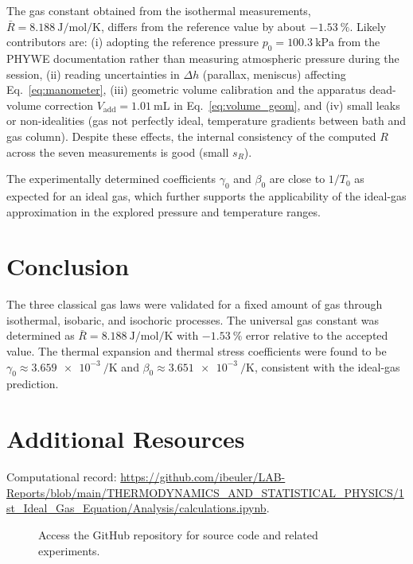 \documentclass[journal]{IEEEtran}
\begin{document}
The gas constant obtained from the isothermal measurements, $\bar{R}=\SI{8.188}{\joule\per\mole\per\kelvin}$, differs from the reference value by about $\SI{-1.53}{\percent}$. Likely contributors are: (i) adopting the reference pressure $p_0=\SI{100.3}{\kilo\pascal}$ from the PHYWE documentation rather than measuring atmospheric pressure during the session, (ii) reading uncertainties in $\Delta h$ (parallax, meniscus) affecting Eq.~\eqref{eq:manometer}, (iii) geometric volume calibration and the apparatus dead-volume correction $V_{\mathrm{add}}=\SI{1.01}{\milli\liter}$ in Eq.~\eqref{eq:volume_geom}, and (iv) small leaks or non-idealities (gas not perfectly ideal, temperature gradients between bath and gas column). Despite these effects, the internal consistency of the computed $R$ across the seven measurements is good (small $s_R$).

The experimentally determined coefficients $\gamma_0$ and $\beta_0$ are close to $1/T_0$ as expected for an ideal gas, which further supports the applicability of the ideal-gas approximation in the explored pressure and temperature ranges.

\section{Conclusion}
The three classical gas laws were validated for a fixed amount of gas through isothermal, isobaric, and isochoric processes. The universal gas constant was determined as $\bar{R}=\SI{8.188}{\joule\per\mole\per\kelvin}$ with $\SI{-1.53}{\percent}$ error relative to the accepted value. The thermal expansion and thermal stress coefficients were found to be $\gamma_0\approx\SI{3.659e-3}{\per\kelvin}$ and $\beta_0\approx\SI{3.651e-3}{\per\kelvin}$, consistent with the ideal-gas prediction.

\section{Additional Resources}
Computational record: \url{https://github.com/ibeuler/LAB-Reports/blob/main/THERMODYNAMICS_AND_STATISTICAL_PHYSICS/1st_Ideal_Gas_Equation/Analysis/calculations.ipynb}.

\begin{figure}[H]
	\centering
	\begin{minipage}{0.15\textwidth}
		\centering
	\end{minipage}%
	\begin{minipage}{0.2\textwidth}
		\raggedright
		\caption{Access the GitHub repository for source code and related experiments.}
		\label{fig:qr_code}
	\end{minipage}
\end{figure}
\end{document}
